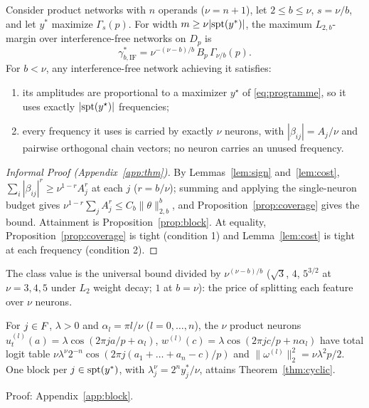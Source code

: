 \begin{theorem}\label{thm:cyclic}
Consider product networks with $n$ operands ($\nu=n+1$), let $2\le b\le\nu$, $s=\nu/b$, and let $y^*$ maximize $\Gamma_s(p)$. For width $m\ge\nu|\mathrm{spt}(y^*)|$, the maximum $L_{2,b}$-margin over interference-free networks on $D_p$ is
\[
\gamma^*_{b,\mathrm{IF}}=\nu^{-(\nu-b)/b}\,B_p\,\Gamma_{\nu/b}(p).
\]
For $b<\nu$, any interference-free network achieving it satisfies:
\begin{enumerate}
  \item its amplitudes are proportional to a maximizer $y^\star$ of \eqref{eq:programme}, so it uses exactly $|\mathrm{spt}(y^\star)|$ frequencies;
  \item every frequency it uses is carried by exactly $\nu$ neurons, with $|\beta_{ij}|=A_j/\nu$ and pairwise orthogonal chain vectors; no neuron carries an unused frequency.
\end{enumerate}
\end{theorem}

\begin{proof}[Informal Proof (Appendix~\ref{app:thm})]
By Lemmas~\ref{lem:sign} and~\ref{lem:cost}, $\sum_i|\beta_{ij}|^r\ge\nu^{1-r}A_j^r$ at each $j$ ($r=b/\nu$); summing and applying the single-neuron budget gives $\nu^{1-r}\sum_jA_j^r\le C_b\|\theta\|_{2,b}^b$, and Proposition~\ref{prop:coverage} gives the bound. Attainment is Proposition~\ref{prop:block}. At equality, Proposition~\ref{prop:coverage} is tight (condition 1) and Lemma~\ref{lem:cost} is tight at each frequency (condition 2).
\end{proof}

The class value is the universal bound divided by $\nu^{(\nu-b)/b}$ ($\sqrt3$, $4$, $5^{3/2}$ at $\nu=3,4,5$ under $L_2$ weight decay; $1$ at $b=\nu$): the price of splitting each feature over $\nu$ neurons. 

\begin{proposition}[]\label{prop:block}
For $j\in F$, $\lambda>0$ and $\alpha_l=\pi l/\nu$ ($l=0,\dots,n$), the $\nu$ product neurons $u^{(l)}_t(a)=\lambda\cos(2\pi ja/p+\alpha_l)$, $w^{(l)}(c)=\lambda\cos(2\pi jc/p+n\alpha_l)$ have total logit table $\nu\lambda^\nu2^{-n}\cos(2\pi j(a_1+\dots+a_n-c)/p)$ and $\|\omega^{(l)}\|_2^2=\nu\lambda^2p/2$. One block per $j\in\mathrm{spt}(y^*)$, with $\lambda_j^\nu=2^ny^*_j/\nu$, attains Theorem~\ref{thm:cyclic}. 

Proof: Appendix~\ref{app:block}.
\end{proposition}

